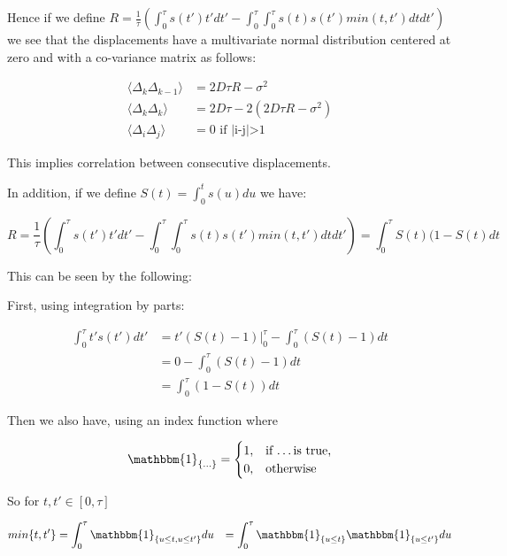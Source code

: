 \documentclass[ba]{imsart}\usepackage[]{graphicx}\usepackage[]{xcolor}
\numberwithin{equation}{section}
\theoremstyle{plain}
\begin{document}
\begin{supplement}
Hence if we define $R= \frac{1}{\tau} \left( \int_{0}^{\tau} s(t') t' dt' - \int_{0}^{\tau} \int_{0}^{\tau} s(t) s(t') min(t,t') dt dt' \right)$ we see that the displacements have a multivariate normal distribution centered at zero and with a co-variance
matrix as follows:

$$
\begin{aligned}
\langle \Delta_{k} \Delta_{k-1} \rangle &= 2D\tau R - \sigma^2 \\
\langle \Delta_{k} \Delta_{k} \rangle &= 2D\tau - 2 \left( 2D\tau R - \sigma^2 \right)\\
\langle \Delta_{i} \Delta_{j} \rangle &= 0 \text{ if |i-j|>1 }
\end{aligned}
$$

This implies correlation between consecutive displacements.

In addition, if we define $S(t) = \int_0^t s(u)du$ we have:

$$
R= \frac{1}{\tau} \left( \int_{0}^{\tau} s(t') t' dt' - \int_{0}^{\tau} \int_{0}^{\tau} s(t) s(t') min(t,t') dt dt' \right)=\int_{0}^{\tau} S(t)(1-S(t)dt
$$

This can be seen by the following:

First, using integration by parts:

\begin{equation} \label{eq:S1}
\begin{aligned}
  \int_{0}^{\tau} t' s(t')  dt' &= t'(S(t)-1) |_{0}^{\tau} - \int_{0}^{\tau} (S(t)-1) dt  \\
  &= 0 - \int_{0}^{\tau} (S(t)-1) dt \\
  &= \int_{0}^{\tau} (1-S(t)) dt
\end{aligned}
\end{equation}

Then we also have, using an index function where

$$
\mathbbm{1}_{\{\ldots \}} = \begin{cases}
1, & \text{if \ldots is true,} \\
0, & \text{otherwise}
\end{cases}
$$


So for $t, t' \in [0,\tau]$

$$
\begin{aligned}
min{\{t,t' \}} &= \int_{0}^{\tau} \mathbbm{1}_{\{u \leq t, u \leq t' \}} du
    &= \int_{0}^{\tau} \mathbbm{1}_{\{u \leq t \}} \mathbbm{1}_{\{u \leq t' \}} du
\end{aligned}
$$


\end{supplement}
\end{document}
